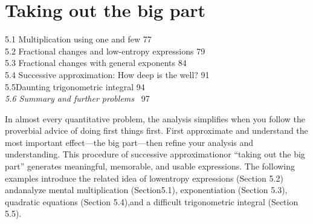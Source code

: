 \documentclass{book}
\newcounter{pro1}
\begin{document}
\renewcommand{\headrulewidth}{0pt}
\fancyhf{} 
\pagestyle{fancy}
\chapter{Taking out the big part} \vspace{3cm}
\colorbox{light-gray}{
\begin{minipage}{\textwidth}
5.1 Multiplication using one and few 77\\
5.2 Fractional changes and low-entropy expressions 79\\
5.3 Fractional changes with general exponents     84\\
5.4 Successive approximation: How deep is the well? 91\\
5.5Daunting trigonometric integral 94\\
\textit {5.6 Summary and further problems} \ 97
\end{minipage}
}\vspace{3mm}
In almost every quantitative problem, the analysis simplifies when you follow the proverbial advice of doing first things first. First approximate and understand the most important effect—the big part—then refine your analysis and understanding. This procedure of successive approximationor “taking out the big part” generates meaningful, memorable, and usable expressions. The following examples introduce the related idea of lowentropy expressions (Section 5.2) andanalyze mental multiplication (Section5.1), exponentiation (Section 5.3), quadratic equations (Section 5.4),and a difficult trigonometric integral (Section 5.5).\\
\\
\end{document}
